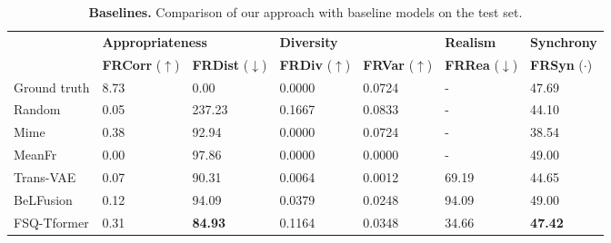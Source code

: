 \documentclass[a4paper,twocolumn]{article}
\begin{document}
\begin{table*}[!t]
\centering
\caption{\textbf{Baselines.} Comparison of our approach with baseline models \cite{song2024react,damfinite} on the test set.}
\begin{tabular}{lllllll} 
\toprule
                                               & \multicolumn{2}{l}{\textbf{Appropriateness}}                  & \multicolumn{2}{l}{\textbf{Diversity}}                    & \textbf{Realism}              & \textbf{Synchrony}        \\ 
\cmidrule(lr){2-7}
                                               & \textbf{FRCorr} ($\uparrow$) & \textbf{FRDist} ($\downarrow$) & \textbf{FRDiv} ($\uparrow$) & \textbf{FRVar} ($\uparrow$) & \textbf{FRRea} ($\downarrow$) & \textbf{FRSyn} ($\cdot$)  \\ 
\midrule
Ground truth                                   & 8.73                         & 0.00                           & 0.0000                      & 0.0724                      & -                             & 47.69                     \\ 
\midrule
Random                                         & 0.05                         & 237.23                         & 0.1667                      & 0.0833                      & -                             & 44.10                     \\
Mime                                           & 0.38                         & 92.94                          & 0.0000                      & 0.0724                      & -                             & 38.54                     \\
MeanFr                                         & 0.00                         & 97.86                          & 0.0000                      & 0.0000                      & -                             & 49.00                     \\ 
\midrule
Trans-VAE\cite{song2024react}                                      & 0.07                         & 90.31                          & 0.0064                      & 0.0012                      & 69.19                         & 44.65                     \\
BeLFusion\cite{song2024react}                                      & 0.12                         & 94.09                          & 0.0379                      & 0.0248                      & 94.09                         & 49.00                     \\
FSQ-Tformer\cite{damfinite}                                    & 0.31                         & \textbf{84.93}                 & 0.1164                      & 0.0348                      & 34.66                         & \textbf{47.42}                     \\

\end{tabular}
\end{table*}
\end{document}
